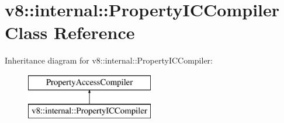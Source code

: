 \hypertarget{classv8_1_1internal_1_1_property_i_c_compiler}{}\section{v8\+:\+:internal\+:\+:Property\+I\+C\+Compiler Class Reference}
\label{classv8_1_1internal_1_1_property_i_c_compiler}
Inheritance diagram for v8\+:\+:internal\+:\+:Property\+I\+C\+Compiler\+:\begin{figure}[H]
\begin{center}
\leavevmode
\includegraphics[height=2.000000cm]{classv8_1_1internal_1_1_property_i_c_compiler}
\end{center}
\end{figure}
